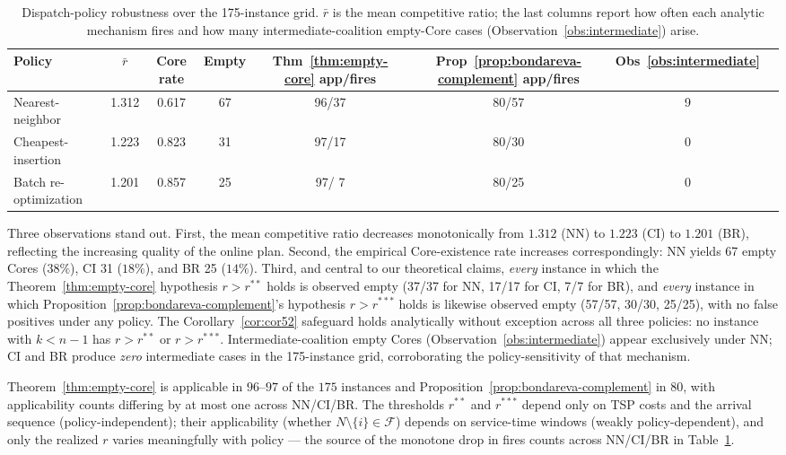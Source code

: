 \documentclass[11pt]{article}
\newcommand{\F}{\mathcal{F}}
\theoremstyle{plain}
\theoremstyle{definition}
\theoremstyle{remark}
\begin{document}
\begin{table}[t]
\centering
\caption{Dispatch-policy robustness over the 175-instance grid. $\bar r$ is the mean competitive ratio; the last columns report how often each analytic mechanism fires and how many intermediate-coalition empty-Core cases (Observation~\ref{obs:intermediate}) arise.}
\label{tab:policy}
\small
\begin{tabular}{@{}lccccccc@{}}
\toprule
Policy & $\bar r$ & Core rate & Empty & Thm~\ref{thm:empty-core} app/fires & Prop~\ref{prop:bondareva-complement} app/fires & Obs~\ref{obs:intermediate} \\
\midrule
Nearest-neighbor      & 1.312 & 0.617 & 67 & 96/37 & 80/57 & 9 \\
Cheapest-insertion    & 1.223 & 0.823 & 31 & 97/17 & 80/30 & 0 \\
Batch re-optimization & 1.201 & 0.857 & 25 & 97/ 7 & 80/25 & 0 \\
\bottomrule
\end{tabular}
\end{table}

Three observations stand out. First, the mean competitive ratio decreases monotonically from $1.312$ (NN) to $1.223$ (CI) to $1.201$ (BR), reflecting the increasing quality of the online plan. Second, the empirical Core-existence rate increases correspondingly: NN yields 67 empty Cores ($38\%$), CI 31 ($18\%$), and BR 25 ($14\%$). Third, and central to our theoretical claims, \emph{every} instance in which the Theorem~\ref{thm:empty-core} hypothesis $r>r^{\ast\ast}$ holds is observed empty (37/37 for NN, 17/17 for CI, 7/7 for BR), and \emph{every} instance in which Proposition~\ref{prop:bondareva-complement}'s hypothesis $r>r^{\ast\ast\ast}$ holds is likewise observed empty (57/57, 30/30, 25/25), with no false positives under any policy. The Corollary~\ref{cor:cor52} safeguard holds analytically without exception across all three policies: no instance with $k<n-1$ has $r>r^{\ast\ast}$ or $r>r^{\ast\ast\ast}$. Intermediate-coalition empty Cores (Observation~\ref{obs:intermediate}) appear exclusively under NN; CI and BR produce \emph{zero} intermediate cases in the 175-instance grid, corroborating the policy-sensitivity of that mechanism.

Theorem~\ref{thm:empty-core} is applicable in $96$--$97$ of the $175$ instances and Proposition~\ref{prop:bondareva-complement} in $80$, with applicability counts differing by at most one across NN/CI/BR. The thresholds $r^{\ast\ast}$ and $r^{\ast\ast\ast}$ depend only on TSP costs and the arrival sequence (policy-independent); their applicability (whether $N\setminus\{i\}\in\F$) depends on service-time windows (weakly policy-dependent), and only the realized $r$ varies meaningfully with policy --- the source of the monotone drop in fires counts across NN/CI/BR in Table~\ref{tab:policy}.
\end{document}
